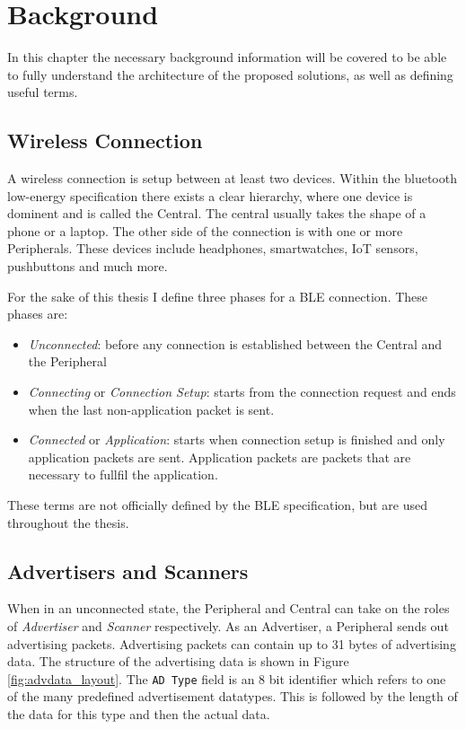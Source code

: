 \chapter{Background}
\label{chp:chapter_2}

In this chapter the necessary background information will be covered to be able to fully understand the architecture of the proposed solutions, as well as defining useful terms. 

\section{Wireless Connection}
\label{sec:ch2_wireless_connection}
A wireless connection is setup between at least two devices. Within the bluetooth low-energy specification there exists a clear hierarchy, where one device is dominent and is called the Central. The central usually takes the shape of a phone or a laptop. The other side of the connection is with one or more Peripherals. These devices include headphones, smartwatches, IoT sensors, pushbuttons and much more. 

For the sake of this thesis I define three phases for a BLE connection. These phases are:
\begin{itemize}
    \item \textit{Unconnected}: before any connection is established between the Central and the Peripheral
    \item \textit{Connecting} or \textit{Connection Setup}: starts from the connection request and ends when the last non-application packet is sent. 
    \item \textit{Connected} or \textit{Application}: starts when connection setup is finished and only application packets are sent. Application packets are packets that are necessary to fullfil the application. 
\end{itemize}
These terms are not officially defined by the BLE specification, but are used throughout the thesis. 

\section{Advertisers and Scanners}
When in an unconnected state, the Peripheral and Central can take on the roles of \textit{Advertiser} and \textit{Scanner} respectively. As an Advertiser, a Peripheral sends out advertising packets. Advertising packets can contain up to 31 bytes of advertising data. The structure of the advertising data is shown in Figure \ref{fig:advdata_layout}. The \texttt{AD Type} field is an 8 bit identifier which refers to one of the many predefined advertisement datatypes. This is followed by the length of the data for this type and then the actual data. 

